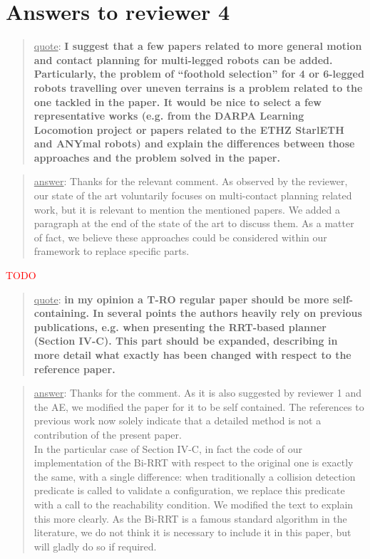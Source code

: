 \documentclass[a4paper]{article}
\newcommand{\ndone}[0]{\textcolor{red}{TODO}}
\newcommand\quot[1]{\begin{quote} \underline{quote}: \textbf{#1}\end{quote}}
\newcommand\as[1]{\begin{quote} \underline{answer}: {#1}\end{quote} }
\begin{document}
\section{Answers to reviewer 4}

\quot{ I suggest that a few papers related to more general motion and contact planning for multi-legged robots can be added. Particularly, the problem of ``foothold selection'' for 4 or 6-legged robots travelling over uneven terrains is a problem related to the one tackled in the paper. It would be nice to select a few representative works (e.g. from the DARPA Learning Locomotion project or
papers related to the ETHZ StarlETH and ANYmal robots) and explain the differences between those approaches and the problem solved in the paper.}
\as{Thanks for the relevant comment. As observed by the reviewer, our state of the art voluntarily focuses on multi-contact planning related work, but it is relevant
to mention the mentioned papers. We added a paragraph at the end of the state of the art to discuss them. As a matter of fact, we believe these approaches could be considered within
our framework to replace specific parts.}\ndone

\quot{in my opinion a T-RO regular paper should be more self-containing. In several points the authors heavily rely on previous publications, e.g. when presenting the RRT-based planner (Section IV-C). This part should be expanded, describing in more detail what exactly has been changed with respect to the reference paper. }
\as{Thanks for the comment. As it is also suggested by reviewer 1 and the AE, we modified the paper for it to be self contained. The references to previous work now solely indicate
that a detailed method is not a contribution of the present paper. \\ 

In the particular case of Section IV-C, in fact the code of our implementation of the Bi-RRT with respect to the original one is exactly the same, with a single difference: when
traditionally a collision detection predicate is called to validate a configuration, we replace this predicate with a call to the reachability condition. We modified the text to explain this more clearly. As the Bi-RRT is a famous standard algorithm in the literature, we do not think it is necessary to include it in this paper, but will gladly do so if required. }
\end{document}
